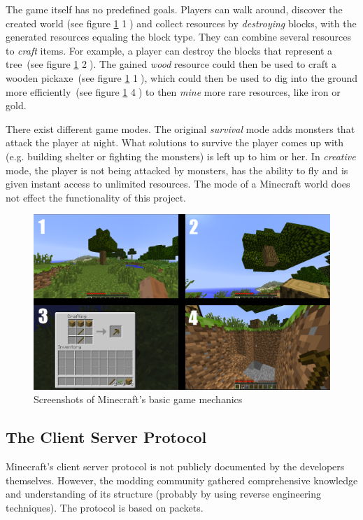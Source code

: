 The game itself has no predefined goals. Players can walk around, discover the created world (see figure \ref{mc_mechanics} \textcircled{1}) and collect resources by \emph{destroying} blocks, with the generated resources equaling the block type. They can combine several resources to \emph{craft} items. For example, a player can destroy the blocks that represent a tree~(see figure \ref{mc_mechanics} \textcircled{2}). The gained \emph{wood} resource could then be used to craft a wooden pickaxe~(see figure \ref{mc_mechanics} \textcircled{1}), which could then be used to dig into the ground more efficiently~(see figure \ref{mc_mechanics} \textcircled{4}) to then \emph{mine} more rare resources, like iron or gold.

There exist different game modes. The original \emph{survival} mode adds monsters that attack the player at night. What solutions to survive the player comes up with (e.g. building shelter or fighting the monsters) is left up to him or her.
In \emph{creative} mode, the player is not being attacked by monsters, has the ability to fly and is given instant access to unlimited resources. The mode of a Minecraft world does not effect the functionality of this project.

\begin{figure}[h]
  \centering
    \includegraphics[width=15cm]{graphics/minecraft_mechanics}
  \caption{Screenshots of Minecraft's basic game mechanics}
  \label{mc_mechanics}
\end{figure}

        \subsection{The Client Server Protocol}
        \label{client_server_protocol}
Minecraft's client server protocol is not publicly documented by the developers themselves. However, the modding community gathered comprehensive knowledge and understanding of its structure (probably by using reverse engineering techniques). The protocol is based on packets. 

